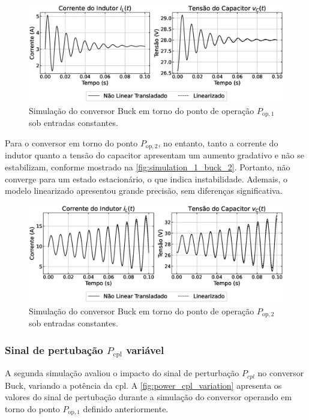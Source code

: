 \begin{figure}[H]
  \centering
  \captionsetup{justification=centering}
  \includegraphics[width=1.\textwidth]{figuras/buck/simulation_1.eps}
  \caption{Simulação do conversor Buck em torno do ponto de operação $P_{\mathrm{op}, 1}$ sob entradas constantes.}
  \label{fig:simulation_1_buck_1}
\end{figure}

Para o conversor em torno do ponto $P_{\mathrm{op}, 2}$, no entanto, tanto a corrente do indutor quanto a tensão do capacitor apresentam um aumento gradativo e não se estabilizam, conforme mostrado na \autoref{fig:simulation_1_buck_2}. Portanto, não converge para um estado estacionário, o que indica instabilidade. Ademais, o modelo linearizado apresentou grande precisão, sem diferenças significativa.

\begin{figure}[H]
  \centering
  \captionsetup{justification=centering}
  \includegraphics[width=1.\textwidth]{figuras/buck/simulation_2.eps}
  \caption{Simulação do conversor Buck em torno do ponto de operação $P_{\mathrm{op}, 2}$ sob entradas constantes.}
  \label{fig:simulation_1_buck_2}
\end{figure}

\subsubsection{Sinal de pertubação $P_{\textrm{cpl}}$ variável}

A segunda simulação avaliou o impacto do sinal de perturbação $P_{cpl}$ no conversor Buck, variando a potência da \acrshort{cpl}. A \autoref{fig:power_cpl_variation} apresenta os valores do sinal de pertubação durante a simulação do conversor operando em torno do ponto $P_{\mathrm{op}, 1}$ definido anteriormente.

